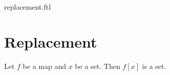 \documentclass{naproche-library}
\begin{document}
\begin{smodule}{replacement.ftl}

  \section{Replacement}

  \begin{axiom}[forthel,title=Replacement Axiom,id=FOUNDATIONS_10_8142956584239104]
    Let $f$ be a map and $x$ be a set.
    Then $f[x]$ is a set.
  \end{axiom}
\end{smodule}
\end{document}
